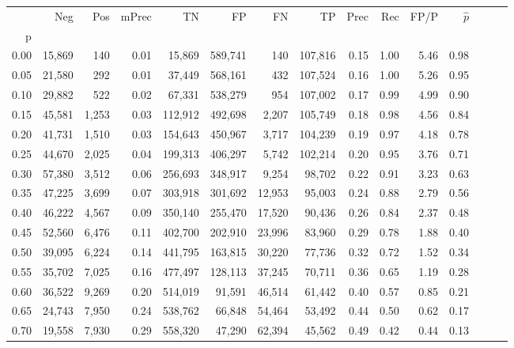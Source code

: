 \begin{tabular}{rrrrrrrrrrrrrrr}
\toprule
{} &     Neg &    Pos & mPrec &       TN &       FP &       FN &       TP &  Prec &   Rec &  FP/P & $\hat{p}$ \\
p    &         &        &       &          &          &          &          &       &       &       &           \\
\midrule
0.00 &  15,869 &    140 &  0.01 &   15,869 &  589,741 &      140 &  107,816 &  0.15 &  1.00 &  5.46 &      0.98 \\
0.05 &  21,580 &    292 &  0.01 &   37,449 &  568,161 &      432 &  107,524 &  0.16 &  1.00 &  5.26 &      0.95 \\
0.10 &  29,882 &    522 &  0.02 &   67,331 &  538,279 &      954 &  107,002 &  0.17 &  0.99 &  4.99 &      0.90 \\
0.15 &  45,581 &  1,253 &  0.03 &  112,912 &  492,698 &    2,207 &  105,749 &  0.18 &  0.98 &  4.56 &      0.84 \\
0.20 &  41,731 &  1,510 &  0.03 &  154,643 &  450,967 &    3,717 &  104,239 &  0.19 &  0.97 &  4.18 &      0.78 \\
0.25 &  44,670 &  2,025 &  0.04 &  199,313 &  406,297 &    5,742 &  102,214 &  0.20 &  0.95 &  3.76 &      0.71 \\
0.30 &  57,380 &  3,512 &  0.06 &  256,693 &  348,917 &    9,254 &   98,702 &  0.22 &  0.91 &  3.23 &      0.63 \\
0.35 &  47,225 &  3,699 &  0.07 &  303,918 &  301,692 &   12,953 &   95,003 &  0.24 &  0.88 &  2.79 &      0.56 \\
0.40 &  46,222 &  4,567 &  0.09 &  350,140 &  255,470 &   17,520 &   90,436 &  0.26 &  0.84 &  2.37 &      0.48 \\
0.45 &  52,560 &  6,476 &  0.11 &  402,700 &  202,910 &   23,996 &   83,960 &  0.29 &  0.78 &  1.88 &      0.40 \\
0.50 &  39,095 &  6,224 &  0.14 &  441,795 &  163,815 &   30,220 &   77,736 &  0.32 &  0.72 &  1.52 &      0.34 \\
0.55 &  35,702 &  7,025 &  0.16 &  477,497 &  128,113 &   37,245 &   70,711 &  0.36 &  0.65 &  1.19 &      0.28 \\
0.60 &  36,522 &  9,269 &  0.20 &  514,019 &   91,591 &   46,514 &   61,442 &  0.40 &  0.57 &  0.85 &      0.21 \\
0.65 &  24,743 &  7,950 &  0.24 &  538,762 &   66,848 &   54,464 &   53,492 &  0.44 &  0.50 &  0.62 &      0.17 \\
0.70 &  19,558 &  7,930 &  0.29 &  558,320 &   47,290 &   62,394 &   45,562 &  0.49 &  0.42 &  0.44 &      0.13 \\

\end{tabular}
